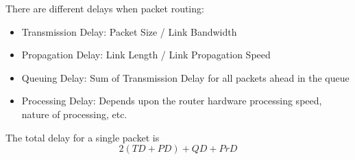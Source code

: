 There are different delays when packet routing:
\begin{itemize}
    \item Transmission Delay: Packet Size / Link Bandwidth
    \item Propagation Delay: Link Length / Link Propagation Speed
    \item Queuing Delay: Sum of Transmission Delay for all packets
          ahead in the queue
    \item Processing Delay: Depends upon the router hardware
          processing speed, nature of processing, etc.
\end{itemize}

The total delay for a single packet is
\begin{equation}
    2(TD + PD) + QD + PrD
\end{equation}